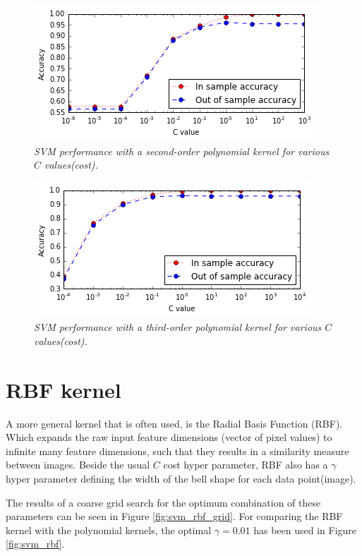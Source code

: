 \documentclass[a4paper,10pt,article,oneside,english]{memoir}
\let\oldcaption\caption
\renewcommand{\caption}[1]{\oldcaption{\emph{#1}}}
\begin{document}
	\begin{figure}[h!]
		\centering
		\includegraphics[width=0.7\linewidth]{svm_poly2.PNG}
		\caption{SVM performance with a second-order polynomial kernel for various $C$ values(cost).}
		\label{fig:svm_poly2}
	\end{figure}
	
	\begin{figure}[h!]
		\centering
		\includegraphics[width=0.7\linewidth]{svm_poly3.PNG}
		\caption{SVM performance with a third-order polynomial kernel for various $C$ values(cost).}
		\label{fig:svm_poly3}
	\end{figure}
	
	
	
	
	
	
	
	
	\section{RBF kernel}
	A more general kernel that is often used, is the Radial Basis Function (RBF).
	Which expands the raw input feature dimensions (vector of pixel values) to infinite many feature dimensions, such that they results in a similarity measure between images. Beside the usual $C$ cost hyper parameter, RBF also has a $\gamma$ hyper parameter defining the width of the bell shape for each data point(image). 
	
	
	The results of a coarse grid search for the optimum combination of these parameters can be seen in Figure \ref{fig:svm_rbf_grid}. 
	For comparing the RBF kernel with the polynomial kernels, the optimal $\gamma=0.01$ has been used in Figure \ref{fig:svm_rbf}.
	
\end{document}
